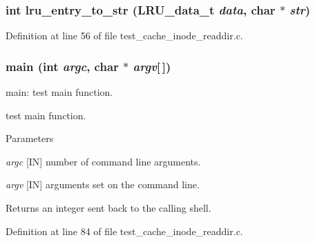 \subsubsection[{lru\_\-entry\_\-to\_\-str}]{\setlength{\rightskip}{0pt plus 5cm}int lru\_\-entry\_\-to\_\-str (LRU\_\-data\_\-t {\em data}, \/  char $\ast$ {\em str})}\label{test__cache__inode__readdir_8c_ad3e6e5506644e1986e6475939863ad3e}


Definition at line 56 of file test\_\-cache\_\-inode\_\-readdir.c.
\subsubsection[{main}]{\setlength{\rightskip}{0pt plus 5cm}main (int {\em argc}, \/  char $\ast$ {\em argv}[$\,$])}\label{test__cache__inode__readdir_8c_ae0665038b72011f5c680c660fcb59459}
main: test main function.

test main function.


\begin{DoxyParams}{Parameters}
\item[{\em argc}][IN] number of command line arguments. \item[{\em argv}][IN] arguments set on the command line.\end{DoxyParams}
\begin{DoxyReturn}{Returns}
an integer sent back to the calling shell. 
\end{DoxyReturn}


Definition at line 84 of file test\_\-cache\_\-inode\_\-readdir.c.